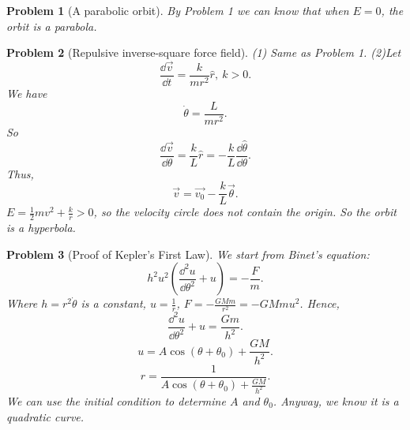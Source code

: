 \documentclass{article}
\theoremstyle{1}
\newtheorem{problem}{Problem}
\begin{document}
\begin{problem}[A parabolic orbit]
    By Problem 1 we can know that when $E=0$, the orbit is a parabola.
\end{problem}
\begin{problem}[Repulsive inverse-square force field]
    (1) Same as Problem 1.
    \newline
    (2)Let 
    \begin{equation}
        \frac{\dd{\vec{v}}}{\dd{t}}=\frac{k}{mr^2}\hat{r},\ k>0.
    \end{equation}
    We have 
    \begin{equation}
        \dot{\theta}=\frac{L}{mr^2}.
    \end{equation}
    So 
    \begin{equation}
        \frac{\dd{\vec{v}}}{\dd{\theta}}=\frac{k}{L}\hat{r}=-\frac{k}{L}\frac{\dd{\hat{\theta}}}{\dd{\theta}}.
    \end{equation}
    Thus, 
    \begin{equation}
        \vec{v}=\vec{v_0}-\frac{k}{L}\vec{\theta}.
    \end{equation}
    $E=\frac{1}{2}mv^2+\frac{k}{r}>0$, so the velocity circle does not contain the origin. So the orbit is a hyperbola.
\end{problem}
\begin{problem}[Proof of Kepler's First Law]
    We start from Binet's equation:
    \begin{equation}
        h^2u^2\left(\frac{\dd^2{u}}{\dd{\theta}^2}+u\right)=-\frac{F}{m}.
    \end{equation}
    Where $h=r^2\dot{\theta}$ is a constant, $u=\frac{1}{r}$, $F=-\frac{GMm}{r^2}=-GMmu^2$. Hence,
    \begin{equation}
        \frac{\dd^2{u}}{\dd{\theta}^2}+u=\frac{Gm}{h^2}.
    \end{equation}
    \begin{equation}
        u=A\cos\left(\theta+\theta_0\right)+\frac{GM}{h^2}.
    \end{equation}
    \begin{equation}
        r=\frac{1}{A\cos\left(\theta+\theta_0\right)+\frac{GM}{h^2}}.
    \end{equation}
    We can use the initial condition to determine $A$ and $\theta_0$. Anyway, we know it is a quadratic curve.
\end{problem}
\end{document}
